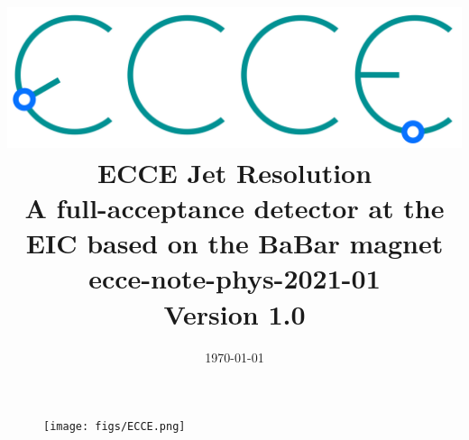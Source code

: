 \renewcommand*\familydefault{\sfdefault}
{\sffamily

\title{\includegraphics[width=0.3\linewidth]{figs/ecce-logo.png}\\ \vspace{0.4pt}
        ECCE Jet Resolution\\
        \large A full-acceptance detector at the EIC based on the BaBar magnet\\
        ecce-note-phys-2021-01\\
        Version 1.0}
\date{\today}
\maketitle


\begin{figure}[H]
  \begin{center}
    \texttt{[image: figs/ECCE.png]}
  \end{center}
\end{figure}
}


\renewcommand*\familydefault{\rmdefault}
